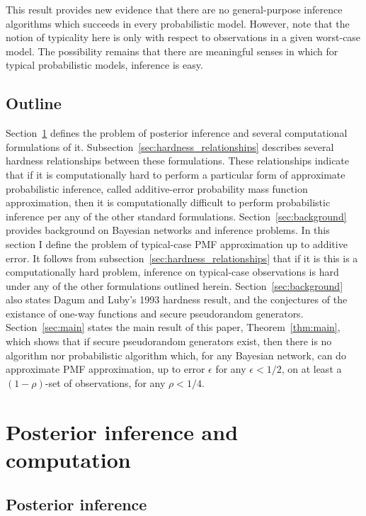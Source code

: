 \documentclass{article}
\theoremstyle{definition}
\theoremstyle{remark}
\begin{document}
This result provides new evidence that there are no general-purpose inference algorithms which succeeds in every probabilistic model.
However, note that the notion of typicality here is only with respect to observations in a given worst-case model.
The possibility remains that there are meaningful senses in which for typical probabilistic models, inference is easy.

\subsection{Outline}
Section~\ref{sec:posterior_inference} defines the problem of posterior inference and several computational formulations of it.
Subsection~\ref{sec:hardness_relationships} describes several hardness relationships between these formulations.
These relationships indicate that if it is computationally hard to perform a particular form of approximate probabilistic inference, called additive-error probability mass function approximation, then it is computationally difficult to perform probabilistic inference per any of the other standard formulations.
Section~\ref{sec:background} provides background on Bayesian networks and inference problems.
In this section I define the problem of typical-case PMF approximation up to additive error.
It follows from subsection~\ref{sec:hardness_relationships} that if it is this is a computationally hard problem, inference on typical-case observations is hard under any of the other formulations outlined herein.
Section~\ref{sec:background} also states Dagum and Luby's 1993 hardness result, and the conjectures of the existance of one-way functions and secure pseudorandom generators.
Section~\ref{sec:main} states the main result of this paper, Theorem~\ref{thm:main}, which shows that if secure pseudorandom generators exist, then there is no algorithm nor probabilistic algorithm which, for any Bayesian network, can do approximate PMF approximation, up to error $\epsilon$ for any $\epsilon < 1/2$, on at least a $(1 - \rho)$-set of observations, for any $\rho < 1/4$.

\section{Posterior inference and computation} \label{sec:posterior_inference}

\subsection{Posterior inference}
\end{document}
